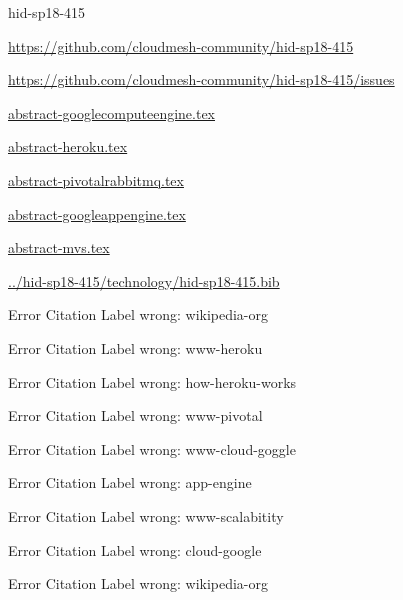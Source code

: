\begin{IU}

hid-sp18-415

\url{https://github.com/cloudmesh-community/hid-sp18-415}

\url{https://github.com/cloudmesh-community/hid-sp18-415/issues}

\href{https://github.com/cloudmesh-community/hid-sp18-415/blob/master//technology/abstract-googlecomputeengine.tex}{abstract-googlecomputeengine.tex}

\href{https://github.com/cloudmesh-community/hid-sp18-415/blob/master//technology/abstract-heroku.tex}{abstract-heroku.tex}

\href{https://github.com/cloudmesh-community/hid-sp18-415/blob/master//technology/abstract-pivotalrabbitmq.tex}{abstract-pivotalrabbitmq.tex}

\href{https://github.com/cloudmesh-community/hid-sp18-415/blob/master//technology/abstract-googleappengine.tex}{abstract-googleappengine.tex}

\href{https://github.com/cloudmesh-community/hid-sp18-415/blob/master//technology/abstract-mvs.tex}{abstract-mvs.tex}

\href{https://github.com/cloudmesh-community/hid-sp18-415/blob/master//technology/hid-sp18-415.bib}{../hid-sp18-415/technology/hid-sp18-415.bib}

 Error Citation Label wrong: wikipedia-org

 Error Citation Label wrong: www-heroku

 Error Citation Label wrong: how-heroku-works

 Error Citation Label wrong: www-pivotal

 Error Citation Label wrong: www-cloud-goggle

 Error Citation Label wrong: app-engine

 Error Citation Label wrong: www-scalabitity

 Error Citation Label wrong: cloud-google

 Error Citation Label wrong: wikipedia-org

\end{IU}


